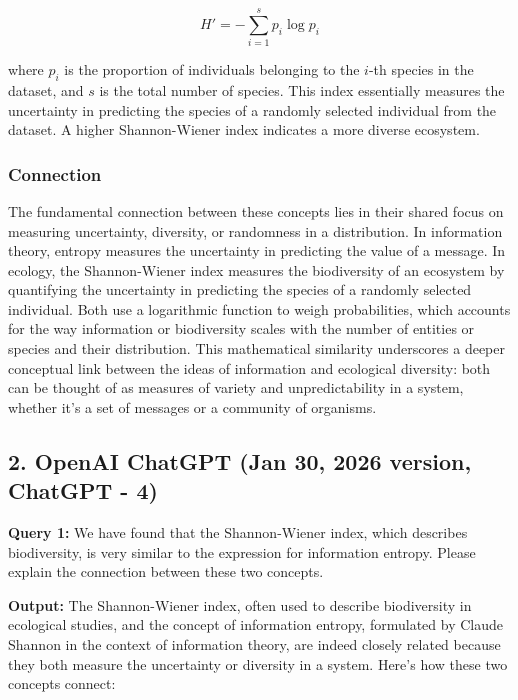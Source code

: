\documentclass{mcmthesis}  %
\begin{document}
	\[
	H' = -\sum_{i = 1}^{s} p_i \log p_i
	\]
	
	where \( p_i \) is the proportion of individuals belonging to the \( i \)-th species in the dataset, and \( s \) is the total number of species. This index essentially measures the uncertainty in predicting the species of a randomly selected individual from the dataset. A higher Shannon-Wiener index indicates a more diverse ecosystem.
	
	\subsubsection*{Connection}
	The fundamental connection between these concepts lies in their shared focus on measuring uncertainty, diversity, or randomness in a distribution. In information theory, entropy measures the uncertainty in predicting the value of a message. In ecology, the Shannon-Wiener index measures the biodiversity of an ecosystem by quantifying the uncertainty in predicting the species of a randomly selected individual. Both use a logarithmic function to weigh probabilities, which accounts for the way information or biodiversity scales with the number of entities or species and their distribution. This mathematical similarity underscores a deeper conceptual link between the ideas of information and ecological diversity: both can be thought of as measures of variety and unpredictability in a system, whether it's a set of messages or a community of organisms.
	
	
	\subsection*{2. OpenAI ChatGPT (Jan 30, 2026 version, ChatGPT - 4)}
	
	
	\textbf{Query 1:} 
	We have found that the Shannon-Wiener index, which describes biodiversity, is very similar to the expression for information entropy. Please explain the connection between these two concepts.
	
	\textbf{Output:} 
	The Shannon-Wiener index, often used to describe biodiversity in ecological studies, and the concept of information entropy, formulated by Claude Shannon in the context of information theory, are indeed closely related because they both measure the uncertainty or diversity in a system. Here's how these two concepts connect:
	
\end{document}
